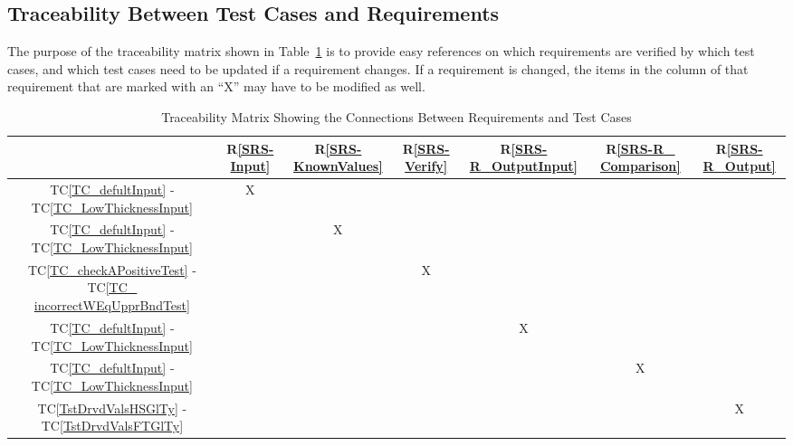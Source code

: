 \documentclass[12pt, titlepage]{article}
\newcommand{\rref}[1]{R\ref{#1}}
\newcommand{\tcref}[1]{TC\ref{#1}}
\newcommand{\progname}{GlassBR}
\begin{document}
\subsection{Traceability Between Test Cases and Requirements}

\noindent The purpose of the traceability matrix shown in 
Table~\ref{Table:T_trace} is to provide easy 
references on which requirements are verified by which test cases, and which 
test cases need to be updated if a requirement changes.  If a requirement is 
changed, the items in the column of that requirement that are marked
with an ``X'' may have to be modified as well. 

\begin{table}[!h]
	\centering
	\begin{tabular}{|c|c|c|c|c|c|c|}
		\hline
		& \rref{SRS-Input}& \rref{SRS-KnownValues}& \rref{SRS-Verify}& \rref{SRS-R_OutputInput}& 
		\rref{SRS-R_ Comparison}& \rref{SRS-R_Output}\\
		\hline
		\tcref{TC_defultInput} - \tcref{TC_LowThicknessInput}                 
		& X& & & & &  \\ \hline
		\tcref{TC_defultInput} - \tcref{TC_LowThicknessInput}                 
		& &X & & & &  \\ \hline
		\tcref{TC_checkAPositiveTest} - \tcref{TC_ incorrectWEqUpprBndTest} 
		& & & X& & & \\ \hline
		\tcref{TC_defultInput} - \tcref{TC_LowThicknessInput}                             
		& & & &X& &   \\ \hline
		\tcref{TC_defultInput} - \tcref{TC_LowThicknessInput}                              
		& & & & &X &   \\ \hline
		\tcref{TstDrvdValsHSGlTy} - \tcref{TstDrvdValsFTGlTy}                                                
		& & & & & &X  \\ \hline
		
		\hline
	\end{tabular}
	\caption{Traceability Matrix Showing the Connections Between Requirements 
	and Test Cases}
	\label{Table:T_trace}
\end{table}

%
\end{document}
